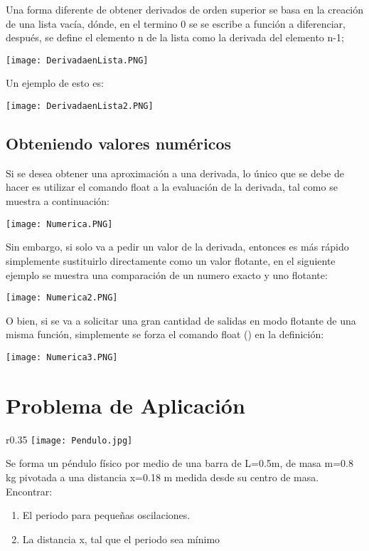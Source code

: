 \documentclass{article}
\begin{document}
Una forma diferente de obtener derivados de orden superior se basa en la creación de una lista vacía, dónde, en el termino 0 se se escribe a función a diferenciar, después, se define el elemento n de la lista como la derivada del elemento n-1;

\begin{center}
\texttt{[image: DerivadaenLista.PNG]}
\end{center}

Un ejemplo de esto es:

\begin{center}
\texttt{[image: DerivadaenLista2.PNG]}
\end{center}

\subsection{Obteniendo valores numéricos}

Si se desea obtener una aproximación a una derivada, lo único que se debe de hacer es utilizar el comando float a la evaluación de la derivada, tal como se muestra a continuación:

\begin{center}
\texttt{[image: Numerica.PNG]}
\end{center}

Sin embargo, si solo va a pedir un valor de la derivada, entonces es más rápido simplemente sustituirlo directamente como un valor flotante, en el siguiente ejemplo se muestra una comparación de un numero exacto y uno flotante:

\begin{center}
\texttt{[image: Numerica2.PNG]}
\end{center}

O bien, si se va a solicitar una gran cantidad de salidas en modo flotante de una misma función, simplemente se forza el comando float () en la definición:

\begin{center}
\texttt{[image: Numerica3.PNG]}
\end{center}

\section{Problema de Aplicación}
\begin{wrapfigure} {r}{0.35\textwidth}
  \centering
  \texttt{[image: Pendulo.jpg]}
\end{wrapfigure}
Se forma un péndulo físico por medio de una barra de L=0.5m, de masa m=0.8 kg pivotada a una distancia x=0.18 m medida desde su centro de masa. Encontrar:
\begin{enumerate}
    \item El periodo para pequeñas oscilaciones.
    \item La distancia x, tal que el periodo sea mínimo
\end{enumerate}
\end{document}
